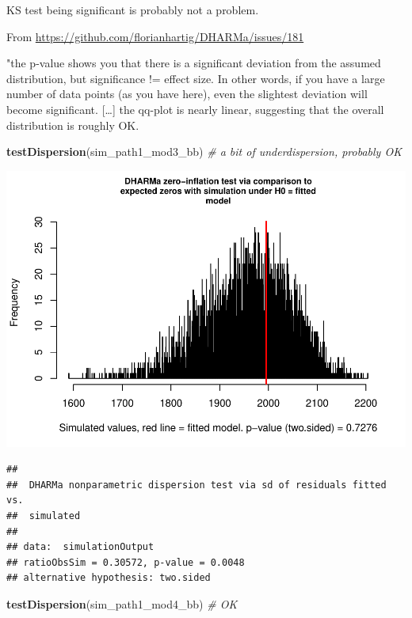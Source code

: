\documentclass[
]{article}
\newenvironment{Shaded}{\begin{snugshade}}{\end{snugshade}}
\newcommand{\CommentTok}[1]{\textcolor[rgb]{0.56,0.35,0.01}{\textit{#1}}}
\newcommand{\KeywordTok}[1]{\textcolor[rgb]{0.13,0.29,0.53}{\textbf{#1}}}
\newcommand{\NormalTok}[1]{#1}
\begin{document}
KS test being significant is probably not a problem.

From \url{https://github.com/florianhartig/DHARMa/issues/181}

"the p-value shows you that there is a significant deviation from the
assumed distribution, but significance != effect size. In other words,
if you have a large number of data points (as you have here), even the
slightest deviation will become significant. {[}\ldots{]} the qq-plot is
nearly linear, suggesting that the overall distribution is roughly OK.

\begin{Shaded}
\begin{Highlighting}[]
\KeywordTok{testDispersion}\NormalTok{(sim\_path1\_mod3\_bb) }\CommentTok{\# a bit of underdispersion, probably OK}
\end{Highlighting}
\end{Shaded}

\includegraphics{lathyrus_ms3_3_after_rev_Ecology_files/figure-latex/unnamed-chunk-15-1.pdf}

\begin{verbatim}
## 
##  DHARMa nonparametric dispersion test via sd of residuals fitted vs.
##  simulated
## 
## data:  simulationOutput
## ratioObsSim = 0.30572, p-value = 0.0048
## alternative hypothesis: two.sided
\end{verbatim}

\begin{Shaded}
\begin{Highlighting}[]
\KeywordTok{testDispersion}\NormalTok{(sim\_path1\_mod4\_bb) }\CommentTok{\# OK}
\end{Highlighting}
\end{Shaded}
\end{document}
